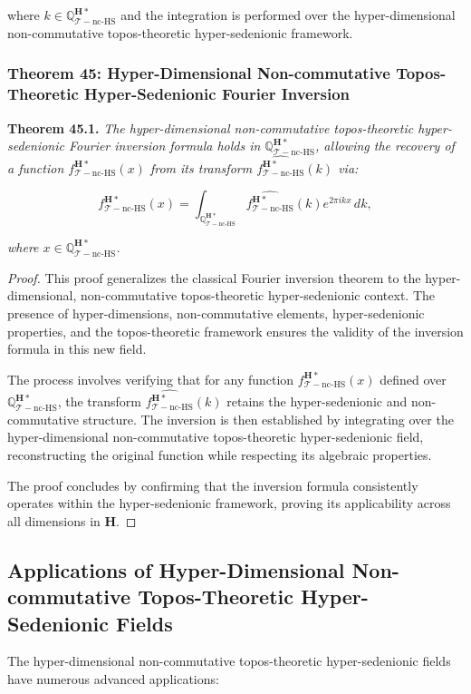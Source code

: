 \documentclass{article}
\begin{document}
where \(k \in \mathbb{Q}_{\mathcal{T}-\text{nc-HS}}^{\mathbf{H}*}\) and the integration is performed over the hyper-dimensional non-commutative topos-theoretic hyper-sedenionic framework.

\subsubsection{Theorem 45: Hyper-Dimensional Non-commutative Topos-Theoretic Hyper-Sedenionic Fourier Inversion}
\textbf{Theorem 45.1.} \textit{The hyper-dimensional non-commutative topos-theoretic hyper-sedenionic Fourier inversion formula holds in \(\mathbb{Q}_{\mathcal{T}-\text{nc-HS}}^{\mathbf{H}*}\), allowing the recovery of a function \(f_{\mathcal{T}-\text{nc-HS}}^{\mathbf{H}*}(x)\) from its transform \(\widehat{f_{\mathcal{T}-\text{nc-HS}}^{\mathbf{H}*}}(k)\) via:}

\[
f_{\mathcal{T}-\text{nc-HS}}^{\mathbf{H}*}(x) = \int_{\mathbb{Q}_{\mathcal{T}-\text{nc-HS}}^{\mathbf{H}*}} \widehat{f_{\mathcal{T}-\text{nc-HS}}^{\mathbf{H}*}}(k) e^{2\pi i k x} \, dk,
\]

\textit{where \(x \in \mathbb{Q}_{\mathcal{T}-\text{nc-HS}}^{\mathbf{H}*}\).}

\begin{proof}
This proof generalizes the classical Fourier inversion theorem to the hyper-dimensional, non-commutative topos-theoretic hyper-sedenionic context. The presence of hyper-dimensions, non-commutative elements, hyper-sedenionic properties, and the topos-theoretic framework ensures the validity of the inversion formula in this new field.

The process involves verifying that for any function \(f_{\mathcal{T}-\text{nc-HS}}^{\mathbf{H}*}(x)\) defined over \( \mathbb{Q}_{\mathcal{T}-\text{nc-HS}}^{\mathbf{H}*}\), the transform \( \widehat{f_{\mathcal{T}-\text{nc-HS}}^{\mathbf{H}*}}(k) \) retains the hyper-sedenionic and non-commutative structure. The inversion is then established by integrating over the hyper-dimensional non-commutative topos-theoretic hyper-sedenionic field, reconstructing the original function while respecting its algebraic properties.

The proof concludes by confirming that the inversion formula consistently operates within the hyper-sedenionic framework, proving its applicability across all dimensions in \( \mathbf{H} \).
\end{proof}

\subsection{Applications of Hyper-Dimensional Non-commutative Topos-Theoretic Hyper-Sedenionic Fields}
The hyper-dimensional non-commutative topos-theoretic hyper-sedenionic fields have numerous advanced applications:
\end{document}
